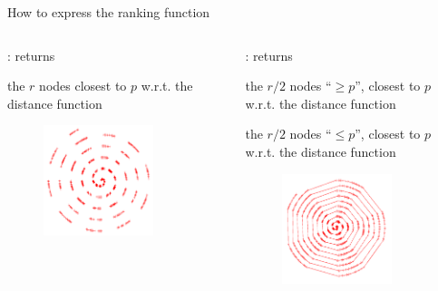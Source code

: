 \begin{frame}{How to express the ranking function}

\begin{columns}
\begin{column}{0.50\textwidth}
: returns
\BI
\item the $r$ nodes closest to $p$ w.r.t. the distance function
\EI
\begin{figure}
	\includegraphics[width=0.75\textwidth]{figs/11/unsorted-line}
\end{figure}
\end{column}
\begin{column}{0.50\textwidth}
: returns
\BI
\item the $r/2$ nodes “$\geq p$”, closest to $p$ w.r.t. the distance function
\item the $r/2$ nodes “$\leq p$”, closest to $p$ w.r.t. the distance function
\EI

\begin{figure}
	\includegraphics[width=0.75\textwidth]{figs/11/sorted-line}
\end{figure}


\end{column}
\end{columns}
\end{frame}
